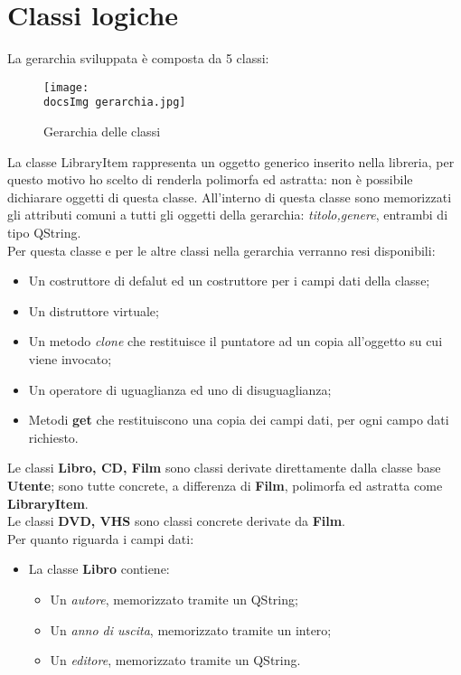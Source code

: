 \section{Classi logiche}{
	La gerarchia sviluppata è composta da 5 classi: 
	
	\begin{figure}[!ht]
		\center
		\texttt{[image: \\docsImg gerarchia.jpg]}
		\caption{Gerarchia delle classi}
	\end{figure} 
	La classe LibraryItem rappresenta un oggetto generico inserito nella libreria, per questo motivo ho scelto di renderla polimorfa ed astratta: non è possibile dichiarare oggetti di questa classe. All'interno di questa classe sono memorizzati gli attributi comuni a tutti gli oggetti della gerarchia: \textit{titolo,genere}, entrambi di tipo QString. \\
	Per questa classe e per le altre classi nella gerarchia verranno resi disponibili:
	\begin{itemize}\itemsep=0.5pt
		\item Un costruttore di defalut ed un costruttore per i campi dati della classe;
		\item Un distruttore virtuale;
		\item Un metodo \textit{clone} che restituisce il puntatore ad un copia all'oggetto su cui viene invocato;
		\item Un operatore di uguaglianza ed uno di disuguaglianza;
		\item Metodi \textbf{get} che restituiscono una copia dei campi dati, per ogni campo dati richiesto.
	\end{itemize}
		Le classi  \textbf{Libro, CD, Film} sono classi derivate direttamente dalla classe base \textbf{Utente}; sono tutte concrete, a differenza di \textbf{Film},  polimorfa ed astratta come \textbf{LibraryItem}. \\
		Le classi \textbf{DVD, VHS} sono classi concrete derivate da \textbf{Film}. \\
		Per quanto riguarda i campi dati:
		\begin{itemize}\itemsep=0.5pt
			\item La classe \textbf{Libro} contiene:
			\begin{itemize}\itemsep=0.5pt
				\item Un \textit{autore}, memorizzato tramite un QString;
				\item Un \textit{anno di uscita}, memorizzato tramite un intero;
				\item Un \textit{editore}, memorizzato tramite un QString.

\end{itemize}
\end{itemize}}
